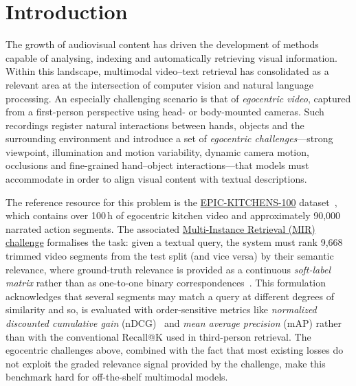 \section{Introduction}
\label{sec:intro}

The growth of audiovisual content has driven the development of methods capable of analysing, indexing and automatically retrieving visual information. Within this landscape, multimodal video--text retrieval has consolidated as a relevant area at the intersection of computer vision and natural language processing. An especially challenging scenario is that of \emph{egocentric video}, captured from a first-person perspective using head- or body-mounted cameras. Such recordings register natural interactions between hands, objects and the surrounding environment and introduce a set of \emph{egocentric challenges}---strong viewpoint, illumination and motion variability, dynamic camera motion, occlusions and fine-grained hand--object interactions---that models must accommodate in order to align visual content with textual descriptions.

The reference resource for this problem is the \href{https://epic-kitchens.github.io/}{EPIC-KITCHENS-100} dataset~\cite{damen2022rescaling}, which contains over 100\,h of egocentric kitchen video and approximately 90{,}000 narrated action segments. The associated \href{https://www.codabench.org/competitions/12008/\#/pages-tab}{Multi-Instance Retrieval (MIR) challenge} formalises the task: given a textual query, the system must rank 9{,}668 trimmed video segments from the test split (and vice versa) by their semantic relevance, where ground-truth relevance is provided as a continuous \emph{soft-label matrix} rather than as one-to-one binary correspondences~\cite{damen2022rescaling,wray2021semantic}. This formulation acknowledges that several segments may match a query at different degrees of similarity and so, is evaluated with order-sensitive metrics like \emph{normalized discounted cumulative gain} (nDCG)~\cite{jarvelin2002ndcg} and \emph{mean average precision} (mAP) rather than with the conventional Recall@K used in third-person retrieval. The egocentric challenges above, combined with the fact that most existing losses do not exploit the graded relevance signal provided by the challenge, make this benchmark hard for off-the-shelf multimodal models.


